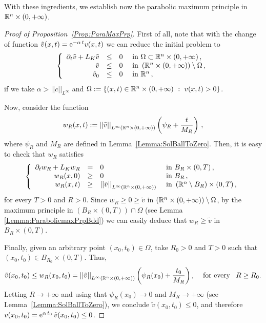 With these ingredients, we establish now the parabolic maximum principle in $\mathbb{R}^n \times (0,+\infty)$. 

\begin{proof}[Proof of Proposition~\ref{Prop:ParaMaxPrp}]
First of all, note that with the change of function $\tilde{v}(x,t) = \mathrm{e}^{-\alpha\,t} v(x,t)$ we can reduce the initial problem to
\begin{equation*}
\left\{\begin{array}{rcll}
\partial_t \tilde{v} + L_K  \tilde{v} &\leq& 0 & \textrm{ in } \Omega \subset\mathbb{R}^n\times(0,+\infty)\,,\\
\tilde{v} &\leq& 0 & \textrm{ in }  \left(\mathbb{R}^n\times(0,+\infty)\right) \setminus  \Omega\,,\\
\tilde{v}_0 &\leq& 0 & \textrm{ in } \mathbb{R}^n\,,
\end{array} \right.
\end{equation*}
if we take $\alpha > ||c||_{L^\infty}$ and $\Omega := \{(x,t)\in \mathbb{R}^n\times(0,+\infty) \ : \ v(x,t) > 0\}$.

Now, consider the function 
$$ 
w_R(x,t) := \left | \left |{\tilde{v} } \right | \right |_{L^\infty(\mathbb{R}^n \times (0,+\infty))} \left( \psi_R + \dfrac{t}{M_R} \right)\,,
$$
where $\psi_R$ and $M_R$ are defined in Lemma~\ref{Lemma:SolBallToZero}. Then, it is easy to check that $w_R$ satisfies
\begin{equation*}
\left\{\begin{array}{rcll}
\partial_t w_R + L_K  w_R &=& 0 & \textrm{ in }B_R\times(0,T)\,,\\
w_R(x,0) &\geq& 0 & \textrm{ in } B_R\,,\\
w_R(x,t) &\geq& \left | \left |{\tilde{v}} \right | \right |_{L^\infty(\mathbb{R}^n \times (0,+\infty))}  & \textrm{ in } \left( \mathbb{R}^n\setminus B_R\right) \times (0,T) \,,
\end{array} \right.
\end{equation*}
for every $T>0$ and $R>0$. Since $w_R \geq 0 \geq \tilde{v}$ in  $\left(\mathbb{R}^n\times(0,+\infty)\right)\setminus \Omega$, by the maximum principle in $(B_R\times (0,T))\cap \Omega$ (see Lemma \ref{Lemma:ParabolicmaxPrpBdd}) we can easily deduce that $ w_R\geq \tilde{v} $ in $B_R\times(0,T)$.

Finally, given an arbitrary point $(x_0,t_0) \in \Omega$, take $R_0>0$ and $T>0$ such that $(x_0,t_0)\in B_{R_0}\times (0,T)$. Thus,
$$ 
\tilde{v}(x_0,t_0) \leq w_R(x_0,t_0) =  \left | \left |{\tilde{v} } \right | \right |_{L^\infty(\mathbb{R}^n \times (0,+\infty))} \left( \psi_R (x_0) + \dfrac{t_0}{M_R} \right), \,\,\,\,\,\text{ for every }\,\,\, R\geq R_0.
$$
Letting $R \to +\infty$ and using that $\psi_R(x_0) \to 0$ and $M_R \to +\infty$ (see Lemma~\ref{Lemma:SolBallToZero}), we conclude $ \tilde{v}(x_0,t_0) \leq  0$, and therefore $ v(x_0,t_0) = \mathrm{e}^{\alpha\,t_0}\,\tilde{v}(x_0,t_0) \leq 0$.
\end{proof}


